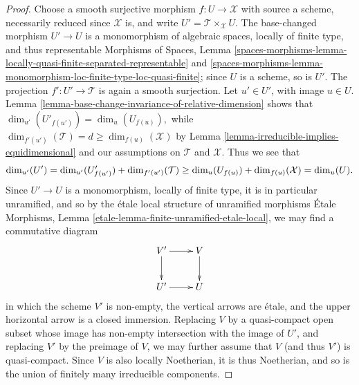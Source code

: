 \documentclass[10pt,a4paper]{amsart}
\theoremstyle{plain}
\theoremstyle{definition}
\theoremstyle{remark}
\numberwithin{equation}{subsection}
\begin{document}
\begin{proof}
Choose a smooth surjective morphism $f:U \to \mathcal{X}$ with source a scheme,
necessarily reduced since $\mathcal{X}$ is,
and write $U' = \mathcal{T}\times_{\mathcal{X}} U$.  The base-changed morphism
$U' \to U$ is a monomorphism of algebraic spaces, locally of finite
type, and thus representable
Morphisms of Spaces, Lemma
\ref{spaces-morphisms-lemma-locally-quasi-finite-separated-representable} and
\ref{spaces-morphisms-lemma-monomorphism-loc-finite-type-loc-quasi-finite};
since $U$ is a scheme, so is $U'$.
The projection $f': U' \to \mathcal{T}$ is again a smooth surjection.
Let $u' \in U'$, with image $u \in U$.
Lemma \ref{lemma-base-change-invariance-of-relative-dimension}
shows that $\dim_{u'}(U'_{f(u')}) = \dim_u(U_{f(u)}),$
while $\dim_{f'(u')}(\mathcal{T}) =d
\geq \dim_{f(u)}(\mathcal{X})$ by
Lemma \ref{lemma-irreducible-implies-equidimensional}
and our assumptions on $\mathcal{T}$ and $\mathcal{X}$.
Thus we see that
\begin{equation}
\label{equation-dim-inequality}
\dim_{u'} (U') = \dim_{u'} (U'_{f(u')}) + \dim_{f'(u')}(\mathcal{T})
\\
\geq \dim_u (U_{f(u)}) + \dim_{f(u)}(\mathcal{X}) = \dim_u (U).
\end{equation}
Since $U' \to U$ is a monomorphism, locally of finite type,
it is in particular unramified,
and so by the \'etale local structure of unramified morphisms
\'Etale Morphisms, Lemma \ref{etale-lemma-finite-unramified-etale-local},
we may find a commutative diagram
$$
\xymatrix{
V' \ar[r]\ar[d] & V \ar[d] \\
U' \ar[r] & U
}
$$
in which the scheme $V'$ is non-empty,
the vertical arrows are \'etale,
and the upper horizontal arrow is a closed immersion.
Replacing $V$ by a quasi-compact open subset
whose image has non-empty intersection with the image of $U'$,
and replacing $V'$ by the preimage of $V$, we may further
assume that $V$ (and thus $V'$) is quasi-compact.
Since $V$ is also locally Noetherian,
it is thus Noetherian, and so is the union of finitely many irreducible
components.


\end{proof}
\end{document}
